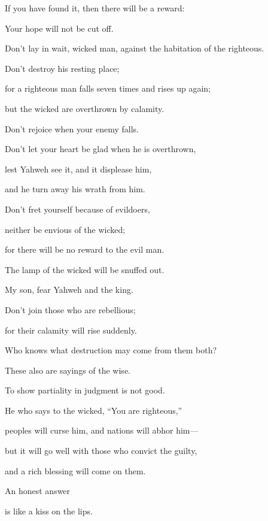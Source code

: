 {\par }{\QB If you have found it, then there will be a reward:
\par }{\QB Your hope will not be cut off.
\par }{\Q {}Don’t lay in wait, wicked man, against the habitation of the righteous.
\par }{\QB Don’t destroy his resting place;
\par }{\Q {}for a righteous man falls seven times and rises up again;
\par }{\QB but the wicked are overthrown by calamity.
\par }{\Q {}Don’t rejoice when your enemy falls.
\par }{\QB Don’t let your heart be glad when he is overthrown,
\par }{\Q {}lest Yahweh see it, and it displease him,
\par }{\QB and he turn away his wrath from him.
\par }{\Q {}Don’t fret yourself because of evildoers,
\par }{\QB neither be envious of the wicked;
\par }{\Q {}for there will be no reward to the evil man.
\par }{\QB The lamp of the wicked will be snuffed out.
\par }{\Q {}My son, fear Yahweh and the king.
\par }{\QB Don’t join those who are rebellious;
\par }{\Q {}for their calamity will rise suddenly.
\par }{\QB Who knows what destruction may come from them both?
\par }{\BB \par }{\PP {}These also are sayings of the wise.
\par }{\BB \par }{\Q To show partiality in judgment is not good.
\par }{\Q {}He who says to the wicked, “You are righteous,”
\par }{\QB peoples will curse him, and nations will abhor him—
\par }{\Q {}but it will go well with those who convict the guilty,
\par }{\QB and a rich blessing will come on them.
\par }{\Q {}An honest answer
\par }{\QB is like a kiss on the lips.
}
